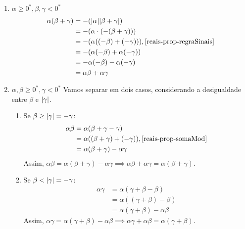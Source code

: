 \documentclass[../main.tex]{subfiles}
\begin{document}
\begin{dem}
\begin{enumerate}
        \item $\alpha \geq 0^*, \beta, \gamma < 0^*$
            \begin{align*}
                \alpha(\beta+\gamma) &= -(\abs{\alpha}\abs{\beta+\gamma}) \\
                &= - (\alpha \cdot (-(\beta+\gamma))) \\
                &= -(\alpha((-\beta)+(-\gamma))),  \text{\Cref{reais-prop-regraSinais}} \\
                &= -(\alpha(-\beta) + \alpha(-\gamma)) \\
                &=-\alpha(-\beta)-\alpha(-\gamma) \\
                &= \alpha\beta + \alpha\gamma
            \end{align*}

        \item $\alpha,\beta \geq 0^*, \gamma < 0^*$
            Vamos separar em dois casos, considerando a desigualdade entre $\beta$ e $\abs{\gamma}$.
            \begin{enumerate}
                \item Se $\beta \geq \abs{\gamma} = -\gamma$:
                    \begin{align*}
                        \alpha\beta &= \alpha(\beta+\gamma-\gamma) \\
                        &= \alpha((\beta+\gamma)+(-\gamma)) , \text{\Cref{reais-prop-somaMod}} \\
                        &= \alpha(\beta+\gamma) - \alpha\gamma \\
                    \end{align*}
                    Assim, $\alpha\beta = \alpha(\beta+\gamma) - \alpha\gamma \implies \alpha\beta + \alpha\gamma = \alpha(\beta+\gamma)$.

                \item Se $\beta < \abs{\gamma} = -\gamma$:
                    \begin{align*}
                        \alpha\gamma &= \alpha(\gamma+\beta-\beta) \\
                        &= \alpha((\gamma+\beta)-\beta) \\
                        &= \alpha(\gamma+\beta) - \alpha\beta
                    \end{align*}
                    Assim, $\alpha\gamma = \alpha(\gamma+\beta) - \alpha\beta \implies \alpha\gamma + \alpha\beta = \alpha(\gamma+\beta)$.

            \end{enumerate}
            



\end{enumerate}
\end{dem}
\end{document}
